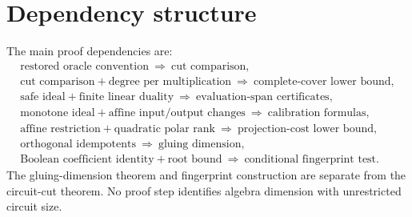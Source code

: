 \documentclass[11pt,letterpaper,oneside]{report}
\theoremstyle{komorebi}
\begin{document}
\section{Dependency structure}
The main proof dependencies are:
\[
\begin{gathered}
\text{restored oracle convention}\ \Longrightarrow\ \text{cut comparison},\\
\text{cut comparison}+\text{degree per multiplication}\
\Longrightarrow\ \text{complete-cover lower bound},\\
\text{safe ideal}+\text{finite linear duality}\
\Longrightarrow\ \text{evaluation-span certificates},\\
\text{monotone ideal}+\text{affine input/output changes}\
\Longrightarrow\ \text{calibration formulas},\\
\text{affine restriction}+\text{quadratic polar rank}\
\Longrightarrow\ \text{projection-cost lower bound},\\
\text{orthogonal idempotents}\ \Longrightarrow\ \text{gluing dimension},\\
\text{Boolean coefficient identity}+\text{root bound}\
\Longrightarrow\ \text{conditional fingerprint test}.
\end{gathered}
\]
The gluing-dimension theorem and fingerprint construction are separate from the circuit-cut theorem. No proof step identifies algebra dimension with unrestricted circuit size.

\clearpage
\end{document}
